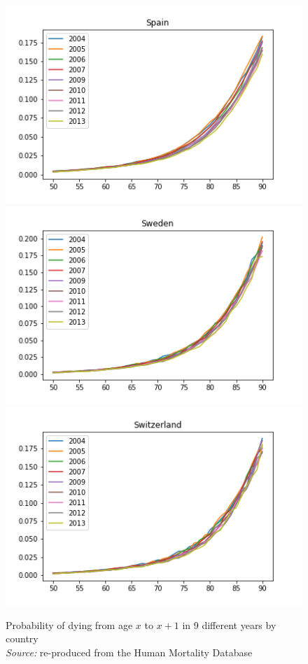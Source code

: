 \begin{figure}[H]
\endminipage\hfill
{}
  \includegraphics[width=\linewidth]{images/mortality_male_7.png}
\endminipage\hfill
{}
  \includegraphics[width=\linewidth]{images/mortality_male_8.png}
\endminipage\hfill
{}%
  \includegraphics[width=\linewidth]{images/mortality_male_9.png}
\endminipage\hfill
    \captionsetup{justification=centering}
\caption{Probability of dying from age $x$ to $x+1$ in 9 different years by country\\ \textit{Source:} re-produced from the Human Mortality Database}
\label{dying_male}
\end{figure}



